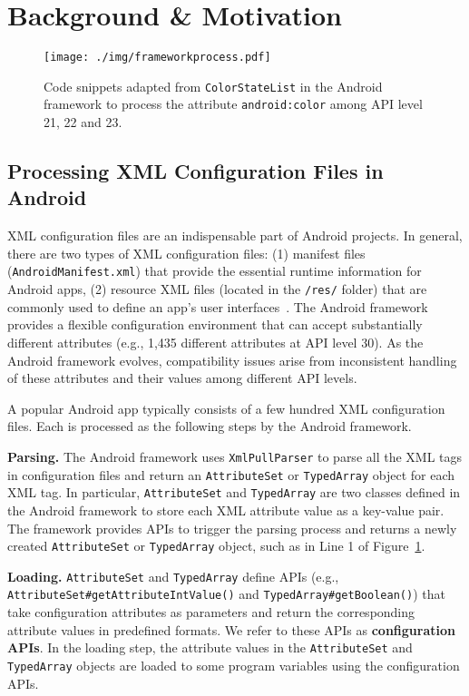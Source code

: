 \section{Background \& Motivation}
\label{sec:2}
\begin{figure}[t]
	\centering
	\texttt{[image: ./img/frameworkprocess.pdf]}
	\caption{
		{Code snippets adapted from \texttt{ColorStateList} in the Android framework to process the attribute \texttt{android:color} among API level 21, 22 and 23.}}
	\label{fig:frameworkprocess}
	
\end{figure}


\subsection{Processing XML Configuration Files in Android}

XML configuration files are an indispensable part of Android projects.
In general, there are two types of XML configuration files: (1) manifest files (\texttt{AndroidManifest.xml}) that provide the essential runtime information for Android apps, (2) resource XML files (located in the \texttt{/res/} folder) that are commonly used to define an app's user interfaces~\cite{xu2018deeprefiner}.
The Android framework provides a flexible configuration environment that can accept substantially different attributes (e.g., 1,435 different attributes at API level 30).
As the Android framework evolves, compatibility issues arise from inconsistent handling of these attributes and their values among different API levels. 

A popular Android app typically consists of a few hundred XML configuration files. Each is processed as the following steps by the Android framework.

\textbf{Parsing.}
The Android framework uses \texttt{XmlPullParser} to parse all the XML tags in configuration files and return an \texttt{AttributeSet} or \texttt{TypedArray} object for each XML tag.
In particular, \texttt{AttributeSet} and \texttt{TypedArray} are two classes defined in the Android framework to store each XML attribute value as a key-value pair.
The framework provides APIs to trigger the parsing process and returns a newly created \texttt{AttributeSet} or \texttt{TypedArray} object, such as  in Line 1 of Figure~\ref{fig:frameworkprocess}.

\textbf{Loading.}
\texttt{AttributeSet} and \texttt{TypedArray} define APIs (e.g., \texttt{AttributeSet\#getAttributeIntValue()} and \texttt{TypedArray\#getBoolean()}) that take configuration attributes as parameters and return the corresponding attribute values in predefined formats. We refer to these APIs as \textbf{configuration APIs}. In the loading step, the attribute values in the \texttt{AttributeSet} and \texttt{TypedArray} objects are loaded to some program variables using the configuration APIs. 

